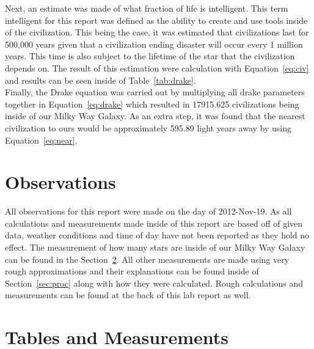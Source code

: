 \documentclass{article}
\begin{document}
Next, an estimate was made of what fraction of life is intelligent. This term intelligent for this report was defined as the ability to create and use
tools inside of the civilization. This being the case, it was estimated that civilizations last for 500,000 years given that a civilization ending 
disaster will occur every 1 million years. This time is also subject to the lifetime of the star that the civilization depends on.
The result of this estimation were calculation with Equation~\ref{eq:civ} and results can be seen inside of Table~\ref{tab:drake}.\\

Finally, the Drake equation was carried out by multiplying all drake parameters together in Equation~\ref{eq:drake} which resulted in
17915.625 civilizations being inside of our Milky Way Galaxy. As an extra step, it was found that the nearest civilization to ours would
be approximately 595.89 light years away by using Equation~\ref{eq:near}.\\



\section{Observations}

All observations for this report were made on the day of 2012-Nov-19. As all calculations and measurements made inside of this report are based off of
given data, weather conditions and time of day have not been reported as they hold no effect. The measurement of how many stars are inside of our
Milky Way Galaxy can be found in the Section~\ref{sec:tnm}. All other measurements are made using very rough approximations and their explanations
can be found inside of Section~\ref{sec:proc} along with how they were calculated. Rough calculations and measurements can be found at the back of
this lab report as well.


\section{Tables and Measurements}
\label{sec:tnm}
\end{document}
